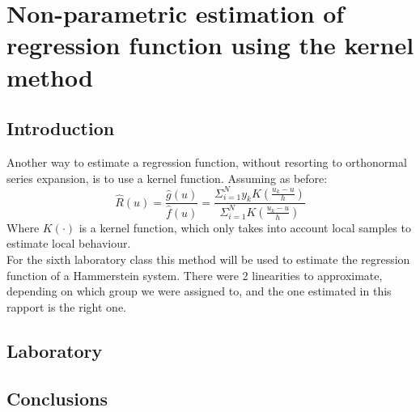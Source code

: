 \chapter{Non-parametric estimation of regression function using the kernel method}
\section{Introduction}
Another way to estimate a regression function, without resorting to orthonormal series expansion,
is to use a kernel function.
Assuming as before:
\begin{equation}
    \hat{R}(u) = \frac{\hat{g}(u)}{\hat{f}(u)} =   \frac{\Sigma_{i=1}^{N} y_k K( \frac{u_k-u}{h}) }{   \Sigma_{i=1}^{N} K( \frac{u_k-u}{h}) }
\end{equation}
Where $K(\cdot)$ is a kernel function, which only takes into account local samples to estimate local behaviour.\\
For the sixth laboratory class this method will be used to estimate the regression function of a Hammerstein system.
There were 2 linearities to approximate, depending on which group we were assigned to, and the one estimated in this rapport is the right one.


\section{Laboratory}



\section{Conclusions}
